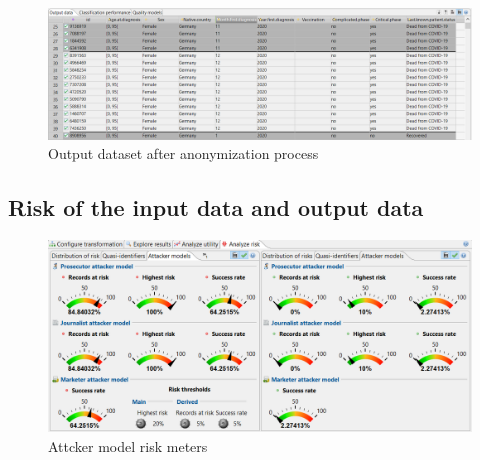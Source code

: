 \begin{figure}[ht]
  \smaller
  \centering
  \includegraphics[width=\textwidth, keepaspectratio]{assets/data_out}
  \caption{Output dataset after anonymization process}
  \label{fig:my_label4}
\end{figure}

\clearpage
\newpage

\subsection{Risk of the input data and output data}

\begin{figure}[ht]
  \smaller
  \centering
  \includegraphics[width=\textwidth, keepaspectratio]{assets/risk_meter}
  \caption{Attcker model risk meters}
  \label{fig:my_label6}
\end{figure}

